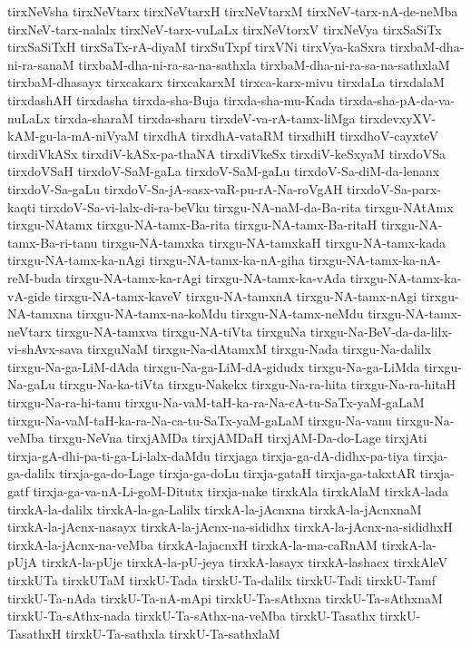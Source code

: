{tirxNeVsha
tirxNeVtarx
tirxNeVtarxH
tirxNeVtarxM
tirxNeV-tarx-nA-de-neMba
tirxNeV-tarx-nalalx
tirxNeV-tarx-vuLaLx
tirxNeVtorxV
tirxNeVya
tirxSaSiTx
tirxSaSiTxH
tirxSaTx-rA-diyaM
tirxSuTxpf
tirxVNi
tirxVya-kaSxra
tirxbaM-dha-ni-ra-sanaM
tirxbaM-dha-ni-ra-sa-na-sathxla
tirxbaM-dha-ni-ra-sa-na-sathxlaM
tirxbaM-dhasayx
tirxcakarx
tirxcakarxM
tirxca-karx-mivu
tirxdaLa
tirxdalaM
tirxdashAH
tirxdasha
tirxda-sha-Buja
tirxda-sha-mu-Kada
tirxda-sha-pA-da-va-nuLaLx
tirxda-sharaM
tirxda-sharu
tirxdeV-va-rA-tamx-liMga
tirxdevxyXV-kAM-gu-la-mA-niVyaM
tirxdhA
tirxdhA-vataRM
tirxdhiH
tirxdhoV-cayxteV
tirxdiVkASx
tirxdiV-kASx-pa-thaNA
tirxdiVkeSx
tirxdiV-keSxyaM
tirxdoVSa
tirxdoVSaH
tirxdoV-SaM-gaLa
tirxdoV-SaM-gaLu
tirxdoV-Sa-diM-da-lenanx
tirxdoV-Sa-gaLu
tirxdoV-Sa-jA-sasx-vaR-pu-rA-Na-roVgAH
tirxdoV-Sa-parx-kaqti
tirxdoV-Sa-vi-lalx-di-ra-beVku
tirxgu-NA-naM-da-Ba-rita
tirxgu-NAtAmx
tirxgu-NAtamx
tirxgu-NA-tamx-Ba-rita
tirxgu-NA-tamx-Ba-ritaH
tirxgu-NA-tamx-Ba-ri-tanu
tirxgu-NA-tamxka
tirxgu-NA-tamxkaH
tirxgu-NA-tamx-kada
tirxgu-NA-tamx-ka-nAgi
tirxgu-NA-tamx-ka-nA-giha
tirxgu-NA-tamx-ka-nA-reM-buda
tirxgu-NA-tamx-ka-rAgi
tirxgu-NA-tamx-ka-vAda
tirxgu-NA-tamx-ka-vA-gide
tirxgu-NA-tamx-kaveV
tirxgu-NA-tamxnA
tirxgu-NA-tamx-nAgi
tirxgu-NA-tamxna
tirxgu-NA-tamx-na-koMdu
tirxgu-NA-tamx-neMdu
tirxgu-NA-tamx-neVtarx
tirxgu-NA-tamxva
tirxgu-NA-tiVta
tirxguNa
tirxgu-Na-BeV-da-da-lilx-vi-shAvx-sava
tirxguNaM
tirxgu-Na-dAtamxM
tirxgu-Nada
tirxgu-Na-dalilx
tirxgu-Na-ga-LiM-dAda
tirxgu-Na-ga-LiM-dA-gidudx
tirxgu-Na-ga-LiMda
tirxgu-Na-gaLu
tirxgu-Na-ka-tiVta
tirxgu-Nakekx
tirxgu-Na-ra-hita
tirxgu-Na-ra-hitaH
tirxgu-Na-ra-hi-tanu
tirxgu-Na-vaM-taH-ka-ra-Na-cA-tu-SaTx-yaM-gaLaM
tirxgu-Na-vaM-taH-ka-ra-Na-ca-tu-SaTx-yaM-gaLaM
tirxgu-Na-vanu
tirxgu-Na-veMba
tirxgu-NeVna
tirxjAMDa
tirxjAMDaH
tirxjAM-Da-do-Lage
tirxjAti
tirxja-gA-dhi-pa-ti-ga-Li-lalx-daMdu
tirxjaga
tirxja-ga-dA-didhx-pa-tiya
tirxja-ga-dalilx
tirxja-ga-do-Lage
tirxja-ga-doLu
tirxja-gataH
tirxja-ga-takxtAR
tirxja-gatf
tirxja-ga-va-nA-Li-goM-Ditutx
tirxja-nake
tirxkAla
tirxkAlaM
tirxkA-lada
tirxkA-la-dalilx
tirxkA-la-ga-Lalilx
tirxkA-la-jAcnxna
tirxkA-la-jAcnxnaM
tirxkA-la-jAcnx-nasayx
tirxkA-la-jAcnx-na-sididhx
tirxkA-la-jAcnx-na-sididhxH
tirxkA-la-jAcnx-na-veMba
tirxkA-lajacnxH
tirxkA-la-ma-caRnAM
tirxkA-la-pUjA
tirxkA-la-pUje
tirxkA-la-pU-jeya
tirxkA-lasayx
tirxkA-lashacx
tirxkAleV
tirxkUTa
tirxkUTaM
tirxkU-Tada
tirxkU-Ta-dalilx
tirxkU-Tadi
tirxkU-Tamf
tirxkU-Ta-nAda
tirxkU-Ta-nA-mApi
tirxkU-Ta-sAthxna
tirxkU-Ta-sAthxnaM
tirxkU-Ta-sAthx-nada
tirxkU-Ta-sAthx-na-veMba
tirxkU-Tasathx
tirxkU-TasathxH
tirxkU-Ta-sathxla
tirxkU-Ta-sathxlaM
}
